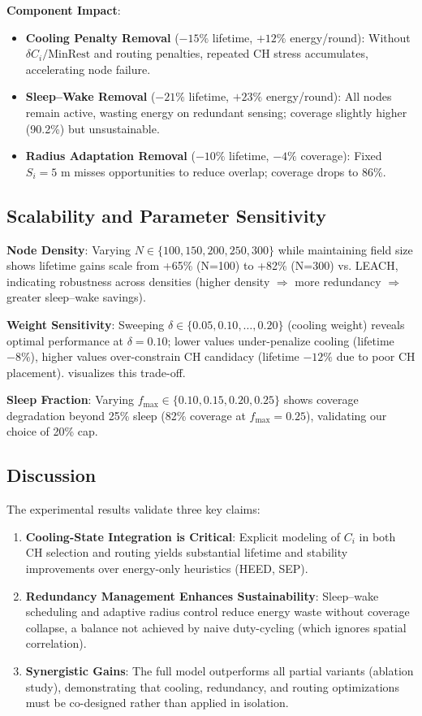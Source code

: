 \textbf{Component Impact}:
\begin{itemize}[noitemsep]
  \item \textbf{Cooling Penalty Removal} ($-15\%$ lifetime, $+12\%$ energy/round): Without $\delta C_i/\text{MinRest}$ and routing penalties, repeated CH stress accumulates, accelerating node failure.
  \item \textbf{Sleep--Wake Removal} ($-21\%$ lifetime, $+23\%$ energy/round): All nodes remain active, wasting energy on redundant sensing; coverage slightly higher (90.2\%) but unsustainable.
  \item \textbf{Radius Adaptation Removal} ($-10\%$ lifetime, $-4\%$ coverage): Fixed $S_i=5$ m misses opportunities to reduce overlap; coverage drops to 86\%.
\end{itemize}

\subsection{Scalability and Parameter Sensitivity}

\textbf{Node Density}: Varying $N \in \{100, 150, 200, 250, 300\}$ while maintaining field size shows lifetime gains scale from +65\% (N=100) to +82\% (N=300) vs. LEACH, indicating robustness across densities (higher density $\Rightarrow$ more redundancy $\Rightarrow$ greater sleep--wake savings).

\textbf{Weight Sensitivity}: Sweeping $\delta \in \{0.05, 0.10, \ldots, 0.20\}$ (cooling weight) reveals optimal performance at $\delta=0.10$; lower values under-penalize cooling (lifetime $-8\%$), higher values over-constrain CH candidacy (lifetime $-12\%$ due to poor CH placement).  visualizes this trade-off.

\textbf{Sleep Fraction}: Varying $f_{\max} \in \{0.10, 0.15, 0.20, 0.25\}$ shows coverage degradation beyond 25\% sleep (82\% coverage at $f_{\max}=0.25$), validating our choice of 20\% cap.

\subsection{Discussion}

The experimental results validate three key claims:
\begin{enumerate}[label=(\Roman*)]
  \item \textbf{Cooling-State Integration is Critical}: Explicit modeling of $C_i$ in both CH selection and routing yields substantial lifetime and stability improvements over energy-only heuristics (HEED, SEP).
  \item \textbf{Redundancy Management Enhances Sustainability}: Sleep--wake scheduling and adaptive radius control reduce energy waste without coverage collapse, a balance not achieved by naive duty-cycling (which ignores spatial correlation).
  \item \textbf{Synergistic Gains}: The full model outperforms all partial variants (ablation study), demonstrating that cooling, redundancy, and routing optimizations must be co-designed rather than applied in isolation.
\end{enumerate}

